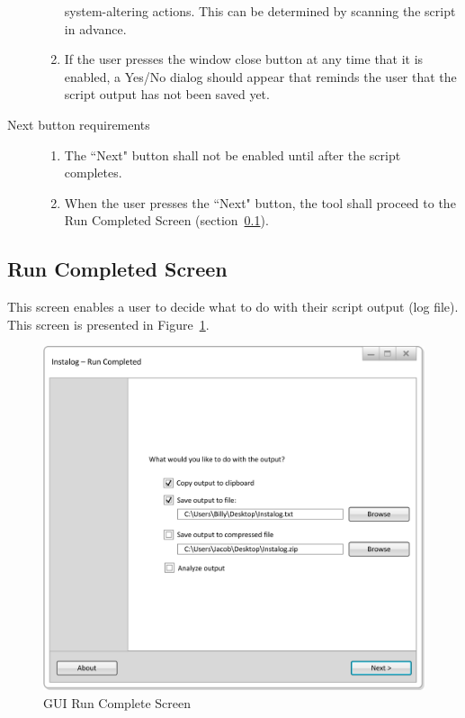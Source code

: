 \begin{description}
\begin{enumerate}
  system-altering actions.  This can be determined by scanning the script in
  advance.
  \item If the user presses the window close button at any time that it is
  enabled, a Yes/No dialog should appear that reminds the user that the script
  output has not been saved yet.
\end{enumerate}
\item[Next button requirements] \hfill 
\begin{enumerate}
  \item The ``Next" button shall not be enabled until after the script 
  completes.
  \item When the user presses the ``Next" button, the tool shall proceed to the
  Run Completed Screen (section~\ref{sec:run_completed_screen}).
\end{enumerate}
\end{description}

\subsection{Run Completed Screen} \label{sec:run_completed_screen}
This screen enables a user to decide what to do with their script output (log
file).  This screen is presented in Figure~\ref{fig:gui_run_complete}.

\begin{figure}[h]
  	\centering
	\includegraphics{figures/gui/Run_Completed.png}
  	\caption{GUI Run Complete Screen}
  	\label{fig:gui_run_complete}
\end{figure}

